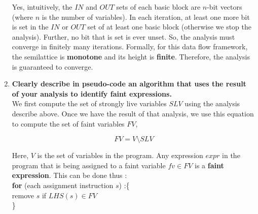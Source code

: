 \begin{enumerate}
  Yes, intuitively, the $IN$ and $OUT$ sets of each basic block are $n$-bit vectors (where $n$ is the number of variables).
  In each iteration, at least one more bit is set in the $IN$ or $OUT$ set of at least one basic block (otherwise we stop the analysis).
  Further, no bit that is set is ever unset.
  So, the analysis must converge in finitely many iterations.
  Formally, for this data flow framework, the semilattice is \textbf{monotone} and its height is \textbf{finite}.
  Therefore, the analysis is guaranteed to converge.

\item \textbf{Clearly describe in pseudo-code an algorithm that uses the result of your analysis to identify faint expressions.} \\

  We first compute the set of strongly live variables $SLV$ using the analysis describe above. Once we have the result of that analysis,
  we use this equation to compute the set of faint variables $FV$,

  $$FV = V \setminus SLV$$

  Here, $V$ is the set of variables in the program. Any expression $expr$ in the program that is being
  assigned to a faint variable $fv \in FV$ is a \textbf{faint expression}. This can be done thus :\\
  
  \textbf{for} (each assignment instruction $s$) :\{\\
  remove $s$ if $LHS(s) \in FV$\\  
  \}\\

\end{enumerate}
